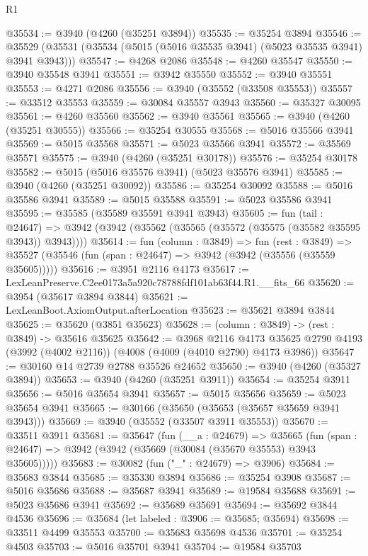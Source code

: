 \begin{lexlean}{R1}
\begin{coremodule}
@35534 := @3940 (@4260 (@35251 @3894))
@35535 := @35254 @3894
@35546 := @35529 (@35531 (@35534 (@5015 (@5016 @35535 @3941) (@5023 @35535 @3941) @3941 @3943)))
@35547 := @4268 @2086
@35548 := @4260 @35547
@35550 := @3940 @35548 @3941
@35551 := @3942 @35550
@35552 := @3940 @35551
@35553 := @4271 @2086
@35556 := @3940 (@35552 (@33508 @35553))
@35557 := @33512 @35553
@35559 := @30084 @35557 @3943
@35560 := @35327 @30095
@35561 := @4260 @35560
@35562 := @3940 @35561
@35565 := @3940 (@4260 (@35251 @30555))
@35566 := @35254 @30555
@35568 := @5016 @35566 @3941
@35569 := @5015 @35568
@35571 := @5023 @35566 @3941
@35572 := @35569 @35571
@35575 := @3940 (@4260 (@35251 @30178))
@35576 := @35254 @30178
@35582 := @5015 (@5016 @35576 @3941) (@5023 @35576 @3941)
@35585 := @3940 (@4260 (@35251 @30092))
@35586 := @35254 @30092
@35588 := @5016 @35586 @3941
@35589 := @5015 @35588
@35591 := @5023 @35586 @3941
@35595 := @35585 (@35589 @35591 @3941 @3943)
@35605 := fun (tail : @24647) =>
  @3942 (@3942 (@35562 (@35565 (@35572 (@35575 (@35582 @35595 @3943)) @3943))))
@35614 := fun (column : @3849) =>
  fun (rest : @3849) =>
  @35527 (@35546 (fun (span : @24647) => @3942 (@3942 (@35556 (@35559 @35605)))))
@35616 := @3951 @2116 @4173
@35617 := LexLeanPreserve.C2ee0173a5a920c78788fdf101ab63f44.R1.__fits_66
@35620 := @3954 (@35617 @3894 @3844)
@35621 := LexLeanBoot.AxiomOutput.afterLocation
@35623 := @35621 @3894 @3844
@35625 := @35620 (@3851 @35623)
@35628 := (column : @3849) -> (rest : @3849) -> @35616 @35625
@35642 := @3968
    @2116
    @4173
    @35625
    @2790
    @4193
    (@3992 (@4002 @2116))
    (@4008 (@4009 (@4010 @2790) @4173 @3986))
@35647 := @30160 @14 @2739 @2788 @35526 @24652
@35650 := @3940 (@4260 (@35327 @3894))
@35653 := @3940 (@4260 (@35251 @3911))
@35654 := @35254 @3911
@35656 := @5016 @35654 @3941
@35657 := @5015 @35656
@35659 := @5023 @35654 @3941
@35665 := @30166 (@35650 (@35653 (@35657 @35659 @3941 @3943)))
@35669 := @3940 (@35552 (@33507 @3911 @35553))
@35670 := @33511 @3911
@35681 := @35647
    (fun (__a : @24679) =>
    @35665 (fun (span : @24647) => @3942 (@3942 (@35669 (@30084 (@35670 @35553) @3943 @35605)))))
@35683 := @30082 (fun ("_" : @24679) => @3906)
@35684 := @35683 @3844
@35685 := @35330 @3894
@35686 := @35254 @3908
@35687 := @5016 @35686
@35688 := @35687 @3941
@35689 := @19584 @35688
@35691 := @5023 @35686 @3941
@35692 := @35689 @35691
@35694 := @35692 @3844 @4536
@35696 := @35684 (let labeled : @3906 := @35685; @35694)
@35698 := @33511 @4499 @35553
@35700 := @35683 @35698 @4536
@35701 := @35254 @4503
@35703 := @5016 @35701 @3941
@35704 := @19584 @35703

\end{coremodule}
\end{lexlean}
